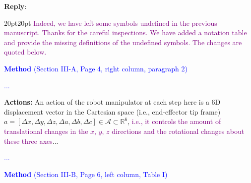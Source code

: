 \documentclass[11pt]{article}
\newenvironment{reply}
   {\medskip \noindent \begin{sf}\textbf{Reply}: \  }
   {\medskip \end{sf}}
\newcommand{\rp}[1]{\textcolor{purple}{#1}}
\newcommand{\xt}[1]{\textcolor{blue}{#1}}
\begin{document}
\begin{reply}
\begin{adjustwidth}{20pt}{20pt}
\rp{Indeed, we have left some symbols undefined in the previous manuscript. Thanks for the careful inspections. We have added a notation table and provide the missing definitions of the undefined symbols. The changes are quoted below.}

\vspace{0.3cm}\noindent\xt{\textbf{Method} (Section III-A, Page 4, right column, paragraph 2)}

\xt{...}

\textbf{Actions:} An action of the robot manipulator at each step here is a 6D displacement vector in the Cartesian space (i.e., end-effector tip frame) $a=[\Delta x, \Delta y, \Delta z, \Delta a, \Delta b, \Delta c]\in\mathcal{A}\subset\mathbb{R}^6$, \rp{i.e., it controls the amount of translational changes in the $x$, $y$, $z$ directions and the rotational changes about these three axes}...

\xt{...}

\clearpage
\vspace{0.3cm}\noindent\xt{\textbf{Method} (Section III-B, Page 6, left column, Table I)}


\end{adjustwidth}
\end{reply}
\end{document}
